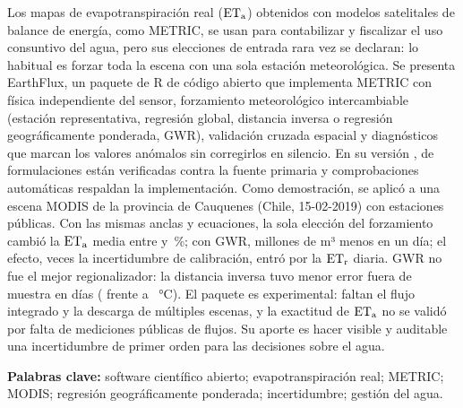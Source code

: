 Los mapas de evapotranspiración real ($\mathrm{ET_a}$) obtenidos con modelos satelitales
de balance de energía, como METRIC, se usan para contabilizar y fiscalizar el
uso consuntivo del agua, pero sus elecciones de entrada rara vez se declaran:
lo habitual es forzar toda la escena con una sola estación meteorológica. Se
presenta EarthFlux, un paquete de R de código abierto que implementa METRIC con
física independiente del sensor, forzamiento meteorológico intercambiable
(estación representativa, regresión global, distancia inversa o regresión
geográficamente ponderada, GWR), validación cruzada espacial y diagnósticos que
marcan los valores anómalos sin corregirlos en silencio. En su versión
\EarthFluxVersion{}, \VerVerified{} de \VerRows{} formulaciones están
verificadas contra la fuente primaria y \NExpectations{} comprobaciones
automáticas respaldan la implementación. Como demostración, se aplicó a una
escena MODIS de la provincia de Cauquenes (Chile, 15-02-2019) con
\NStations{} estaciones públicas. Con las mismas anclas y ecuaciones, la sola
elección del forzamiento cambió la $\mathrm{ET_a}$ media entre \DEtaCThreeGWRPct{} y
\DEtaCTwoIDWPct\,\%; con GWR, \VolDiffAbsCThreeGWR{} millones de m³ menos en un
día; el efecto, \RatioSA{} veces la incertidumbre de calibración, entró por la
$\mathrm{ET_r}$ diaria. GWR no fue el mejor regionalizador: la
distancia inversa tuvo menor error fuera de muestra en \NCVDays{} días
(\CVTaCTwoIDWRmse{} frente a \CVTaCThreeGWRRmse~°C). El paquete es
experimental: faltan el flujo integrado y la descarga de múltiples escenas, y
la exactitud de $\mathrm{ET_a}$ no se validó por falta de mediciones públicas de flujos.
Su aporte es hacer visible y auditable una incertidumbre de primer orden para
las decisiones sobre el agua.

\medskip\noindent\textbf{Palabras clave:} software científico abierto; evapotranspiración real;
METRIC; MODIS; regresión geográficamente ponderada; incertidumbre; gestión del agua.
